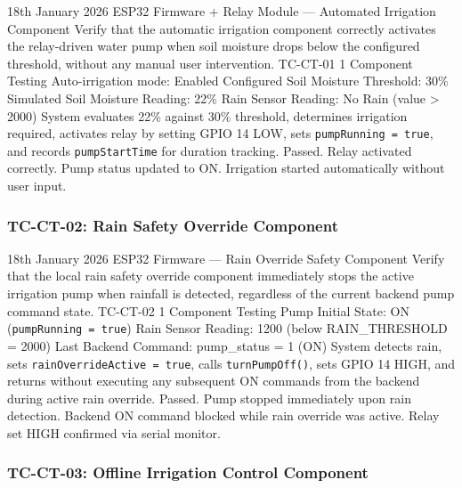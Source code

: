 \testcase%
{18th January 2026}%
{ESP32 Firmware + Relay Module --- Automated Irrigation
Component}%
{Verify that the automatic irrigation component correctly
activates the relay-driven water pump when soil moisture
drops below the configured threshold, without any manual
user intervention.}%
{TC-CT-01}%
{1}%
{Component Testing}%
{Auto-irrigation mode: Enabled \newline
Configured Soil Moisture Threshold: 30\% \newline
Simulated Soil Moisture Reading: 22\% \newline
Rain Sensor Reading: No Rain (value \textgreater{} 2000)}%
{System evaluates 22\% against 30\% threshold, determines
irrigation required, activates relay by setting GPIO 14
LOW, sets \texttt{pumpRunning = true}, and records
\texttt{pumpStartTime} for duration tracking.}%
{Passed. Relay activated correctly. Pump status updated to
ON. Irrigation started automatically without user input.}

\subsubsection{TC-CT-02: Rain Safety Override Component}

\testcase%
{18th January 2026}%
{ESP32 Firmware --- Rain Override Safety Component}%
{Verify that the local rain safety override component
immediately stops the active irrigation pump when rainfall
is detected, regardless of the current backend pump
command state.}%
{TC-CT-02}%
{1}%
{Component Testing}%
{Pump Initial State: ON (\texttt{pumpRunning = true}) \newline
Rain Sensor Reading: 1200 (below RAIN\_THRESHOLD = 2000)
\newline
Last Backend Command: pump\_status = 1 (ON)}%
{System detects rain, sets \texttt{rainOverrideActive =
true}, calls \texttt{turnPumpOff()}, sets GPIO 14 HIGH,
and returns without executing any subsequent ON commands
from the backend during active rain override.}%
{Passed. Pump stopped immediately upon rain detection.
Backend ON command blocked while rain override was active.
Relay set HIGH confirmed via serial monitor.}

\subsubsection{TC-CT-03: Offline Irrigation Control Component}

